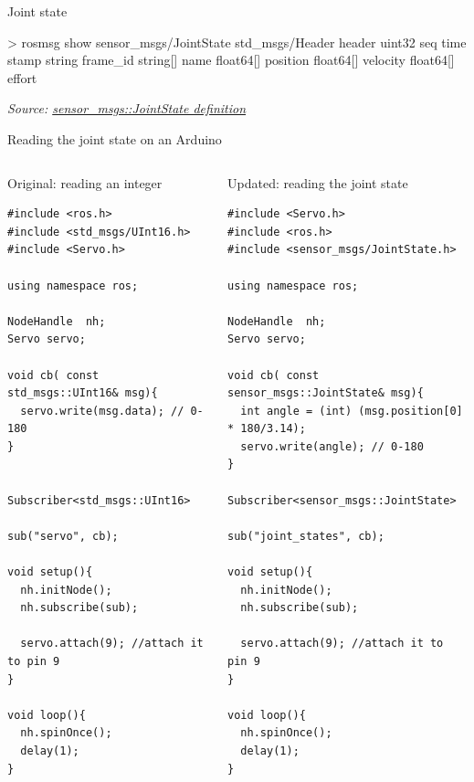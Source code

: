 \documentclass[compress]{beamer}
\newcommand{\source}[2]{{\tiny\it Source: \href{#1}{#2}}}
\begin{document}
\begin{frame}[fragile]{Joint state}
\begin{shcode}
> rosmsg show sensor_msgs/JointState 
std_msgs/Header header
  uint32 seq
  time stamp
  string frame_id
string[] name
float64[] position
float64[] velocity
float64[] effort
\end{shcode}

\source{http://docs.ros.org/api/sensor_msgs/html/msg/JointState.html}{sensor\_msgs::JointState definition}
\end{frame}


\begin{frame}[fragile]{Reading the joint state on an Arduino}
\begin{columns}
    \begin{column}{0.5\linewidth}

\small Original: reading an integer
\begin{verbatim}
#include <ros.h>
#include <std_msgs/UInt16.h>
#include <Servo.h> 

using namespace ros;

NodeHandle  nh;
Servo servo;

void cb( const std_msgs::UInt16& msg){
  servo.write(msg.data); // 0-180
}


Subscriber<std_msgs::UInt16> 
                        sub("servo", cb);

void setup(){
  nh.initNode();
  nh.subscribe(sub);

  servo.attach(9); //attach it to pin 9
}

void loop(){
  nh.spinOnce();
  delay(1);
}
\end{verbatim}
    \end{column}
    \begin{column}{0.5\linewidth}

\small Updated: reading the joint state

\begin{verbatim}
#include <Servo.h> 
#include <ros.h>
#include <sensor_msgs/JointState.h>

using namespace ros;

NodeHandle  nh;
Servo servo;

void cb( const sensor_msgs::JointState& msg){
  int angle = (int) (msg.position[0] * 180/3.14);
  servo.write(angle); // 0-180
}

Subscriber<sensor_msgs::JointState>
                        sub("joint_states", cb);

void setup(){
  nh.initNode();
  nh.subscribe(sub);
  
  servo.attach(9); //attach it to pin 9
}

void loop(){
  nh.spinOnce();
  delay(1);
}
\end{verbatim}



    \end{column}
\end{columns}
\end{frame}
\end{document}
